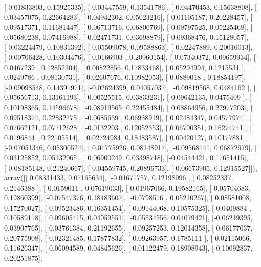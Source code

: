 \documentclass{article}
\begin{document}
       [ 0.01833803,  0.15925335],
       [-0.03447559,  0.13541786],
       [ 0.04470453,  0.15638808],
       [ 0.03457075,  0.22664283],
       [-0.04942302,  0.05023216],
       [ 0.01105187,  0.20228457],
       [ 0.09517371,  0.11681447],
       [-0.06713716,  0.06806769],
       [-0.09797525,  0.05225468],
       [ 0.05680238,  0.07416988],
       [-0.02471731,  0.03698879],
       [-0.09368476,  0.15128057],
       [-0.03224479,  0.10831392],
       [ 0.05509078,  0.09588863],
       [ 0.02247889,  0.20016013],
       [-0.00706428,  0.10304476],
       [-0.0166903 ,  0.20960154],
       [ 0.07340372,  0.09659934],
       [ 0.0467239 ,  0.12852304],
       [ 0.00822856,  0.17833468],
       [ 0.05294994,  0.1215531 ],
       [ 0.0249786 ,  0.08130731],
       [ 0.02607676,  0.10982053],
       [-0.0889018 ,  0.18854197],
       [-0.09098548,  0.14391971],
       [-0.02624399,  0.04057037],
       [-0.09819568,  0.0484162 ],
       [ 0.05656713,  0.13161193],
       [-0.00525515,  0.03833231],
       [ 0.09642135,  0.0475409 ],
       [ 0.10198365,  0.14596678],
       [-0.08919565,  0.22455484],
       [ 0.08864956,  0.22977203],
       [ 0.09518374,  0.22832775],
       [-0.0685639 ,  0.06938919],
       [ 0.02484347,  0.04577974],
       [ 0.07662121,  0.07712628],
       [-0.0132203 ,  0.12052353],
       [ 0.06700351,  0.16274741],
       [ 0.0196844 ,  0.22105514],
       [ 0.02724984,  0.18483587],
       [ 0.00420127,  0.10177881],
       [-0.07051346,  0.05300524],
       [ 0.01775926,  0.08148917],
       [-0.09568141,  0.06872979],
       [ 0.03125852,  0.05132065],
       [ 0.06900249,  0.03398718],
       [-0.04544421,  0.17651415],
       [-0.08185148,  0.21240667],
       [ 0.04559745,  0.20896733],
       [-0.06673905,  0.12915527]]), array([[ 0.08331433,  0.07165634],
       [-0.04671757,  0.12198096],
       [ 0.08252337,  0.2146388 ],
       [-0.0159011 ,  0.07619033],
       [ 0.01967066,  0.19582165],
       [-0.05704683,  0.19860399],
       [-0.07547376,  0.18483607],
       [-0.0798516 ,  0.05210267],
       [ 0.08581008,  0.17270027],
       [-0.09523486,  0.16351454],
       [-0.09144068,  0.10575325],
       [ 0.0409884 ,  0.10589118],
       [ 0.09605415,  0.04059551],
       [-0.05534556,  0.04079421],
       [-0.06219395,  0.03907765],
       [-0.03761384,  0.21192655],
       [-0.09257253,  0.12014358],
       [ 0.06177037,  0.20775908],
       [ 0.02321485,  0.17877832],
       [ 0.09263957,  0.1785111 ],
       [ 0.02115066,  0.11626347],
       [-0.06094589,  0.04845626],
       [-0.01122479,  0.18908943],
       [-0.10092837,  0.20251875],
\end{document}
